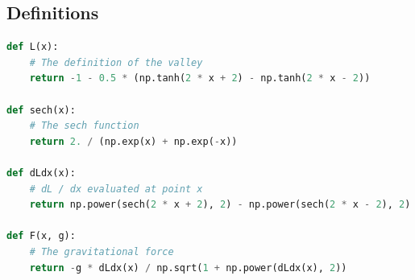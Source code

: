 \documentclass[10pt,a4paper]{article}
\begin{document}
\subsection{Definitions}
\begin{lstlisting}[language=Python]
def L(x):
    # The definition of the valley
    return -1 - 0.5 * (np.tanh(2 * x + 2) - np.tanh(2 * x - 2))
    
def sech(x):
    # The sech function
    return 2. / (np.exp(x) + np.exp(-x))

def dLdx(x):
    # dL / dx evaluated at point x
    return np.power(sech(2 * x + 2), 2) - np.power(sech(2 * x - 2), 2)
    
def F(x, g):
    # The gravitational force
    return -g * dLdx(x) / np.sqrt(1 + np.power(dLdx(x), 2))
\end{lstlisting}
\end{document}
